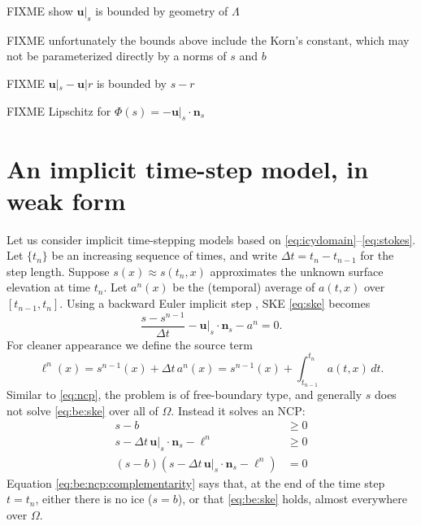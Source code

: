 \documentclass[hidelinks,onefignum,onetabnum,final]{siamart220329}  %
\newcommand{\bn}{\mathbf{n}}
\newcommand{\bu}{\mathbf{u}}
\begin{document}
\begin{lemma} \label{lem:stokestrace}
FIXME show $\bu|_s$ is bounded by geometry of $\Lambda$
\end{lemma}

FIXME unfortunately the bounds above include the Korn's constant, which may not be parameterized directly by a norms of $s$ and $b$

\begin{conjecture} \label{conj:a}
FIXME $\bu|_s - \bu|r$ is bounded by $s-r$
\end{conjecture}

\begin{lemma} \label{lem:philipschitz}
FIXME Lipschitz for $\Phi(s) = -\bu|_s\cdot \bn_s$
\end{lemma}

\section{An implicit time-step model, in weak form} \label{sec:model}

Let us consider implicit time-stepping models based on \eqref{eq:icydomain}--\eqref{eq:stokes}.  Let $\{t_n\}$ be an increasing sequence of times, and write $\Delta t = t_n-t_{n-1}$ for the step length.  Suppose $s(x)\approx s(t_n,x)$ approximates the unknown surface elevation at time $t_n$.  Let $a^n(x)$ be the (temporal) average of $a(t,x)$ over $[t_{n-1},t_n]$.  Using a backward Euler implicit step \cite{AscherPetzold1998}, SKE \eqref{eq:ske} becomes
\begin{equation}
\frac{s - s^{n-1}}{\Delta t} - \bu|_{s} \cdot \bn_{s} - a^n = 0. \label{eq:be:ske}
\end{equation}
For cleaner appearance we define the source term
\begin{equation}
\ell^n(x) = s^{n-1}(x)+\Delta t\,a^n(x) = s^{n-1}(x) + \int_{t_{n-1}}^{t_n} a(t,x)\,dt. \label{eq:be:source}
\end{equation}
Similar to \eqref{eq:ncp}, the problem is of free-boundary type, and generally $s$ does not solve \eqref{eq:be:ske} over all of $\Omega$.  Instead it solves an NCP:
\begin{subequations}
\label{eq:be:ncp}
\begin{align}
s - b &\ge 0 \label{eq:be:ncp:constraint} \\
s - \Delta t\,\bu|_s \cdot \bn_s - \ell^n &\ge 0 \\
(s - b) \left(s - \Delta t\,\bu|_s \cdot \bn_s - \ell^n\right) &= 0 \label{eq:be:ncp:complementarity}
\end{align}
\end{subequations}
Equation \eqref{eq:be:ncp:complementarity} says that, at the end of the time step $t=t_n$, either there is no ice ($s=b$), or that \eqref{eq:be:ske} holds, almost everywhere over $\Omega$.
\end{document}
